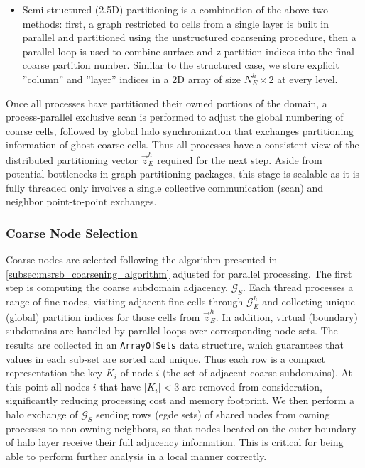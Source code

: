 \begin{itemize}
\item Semi-structured (2.5D) partitioning is a combination of the above two methods: first, a graph restricted to cells from a single layer is built in parallel and partitioned using the unstructured coarsening procedure, then a parallel loop is used to combine surface and z-partition indices into the final coarse partition number.   Similar to the structured case, we store explicit ''column'' and ''layer'' indices in a 2D array of size $N_E^h \times 2$ at every level.
\end{itemize}
Once all processes have partitioned their owned portions of the domain, a process-parallel exclusive scan is performed to adjust the global numbering of coarse cells, followed by global halo synchronization that exchanges partitioning information of ghost coarse cells.   Thus all processes have a consistent view of the distributed partitioning vector $\vec{z}_E^h$ required for the next step.   Aside from potential bottlenecks in graph partitioning packages, this stage is scalable as it is fully threaded only involves a single collective communication (scan) and neighbor point-to-point exchanges.

\subsubsection{Coarse Node Selection}
\label{subsubsec:par_kernels_coarsening_nodes}

Coarse nodes are selected following the algorithm presented in \autoref{subsec:msrsb_coarsening_algorithm} adjusted for parallel processing.   The first step is computing the coarse subdomain adjacency, $\mathcal{G}_S$.   Each thread processes a range of fine nodes, visiting adjacent fine cells through $\mathcal{G}_E^h$ and collecting unique (global) partition indices for those cells from $\vec{z}_E^h$.   In addition, virtual (boundary) subdomains are handled by parallel loops over corresponding node sets.   The results are collected in an \texttt{ArrayOfSets} data structure, which guarantees that values in each sub-set are sorted and unique.   Thus each row is a compact representation the key $K_i$ of node $i$ (the set of adjacent coarse subdomains).   At this point all nodes $i$ that have $|K_i| < 3$ are removed from consideration, significantly reducing processing cost and memory footprint.   We then perform a halo exchange of $\mathcal{G}_S$ sending rows (egde sets) of shared nodes from owning processes to non-owning neighbors, so that nodes located on the outer boundary of halo layer receive their full adjacency information.    This is critical for being able to perform further analysis in a local manner correctly.

